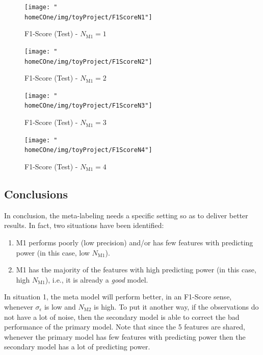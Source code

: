 \documentclass[a4paper]{article}
\newcommand{\homeCOne}{../../Chapter 1 - Metalabeling/Draft}
\begin{document}
\begin{figure}[htbp]
\centering
	\begin{minipage}{.5\textwidth}
	\centering
		\texttt{[image: "\\homeCOne/img/toyProject/F1ScoreN1"]}
	  	\caption{F1-Score (Test) - $N_{\text{M1}} = 1$}
	  	\label{fig:F1ScoreN1}
	\end{minipage}%
	\begin{minipage}{.5\textwidth}
	\centering
		\texttt{[image: "\\homeCOne/img/toyProject/F1ScoreN2"]}
		\caption{F1-Score (Test) - $N_{\text{M1}} = 2$}
		\label{fig:F1ScoreN2}
	\end{minipage}

	\vspace{.5cm}

	\begin{minipage}{.5\textwidth}
	\centering
		\texttt{[image: "\\homeCOne/img/toyProject/F1ScoreN3"]}
		\caption{F1-Score (Test) - $N_{\text{M1}} = 3$}
		\label{fig:F1ScoreN3}
	\end{minipage}%
	\begin{minipage}{.5\textwidth}
	\centering
		\texttt{[image: "\\homeCOne/img/toyProject/F1ScoreN4"]}
		\caption{F1-Score (Test) - $N_{\text{M1}} = 4$}
		\label{fig:F1ScoreN4}
	\end{minipage}
\end{figure}

\subsection{Conclusions}
In conclusion, the meta-labeling needs a specific setting so as to 
deliver better results. In fact, two situations have been identified:

\begin{enumerate}
	\item M1 performs poorly (low precision) and/or has few features
	with predicting 	power (in this case, low $N_{\text{M1}}$).
	\item M1 has the majority of the features with high predicting 
	power (in this case, high $N_{\text{M1}}$), i.e., it is already a 
	\textit{good} model.
\end{enumerate}

In situation 1, the meta model will perform better, in an F1-Score 
sense, whenever $\sigma_\epsilon$ is low and $N_{\text{M2}}$ is high. 
To put it another way, if the observations do not have a lot of noise, 
then the secondary model is able to correct the bad performance of the 
primary model. Note that since the 5 features are shared, whenever the 
primary model has few features with predicting power then the 
secondary model has a lot of predicting power.\\
\end{document}
